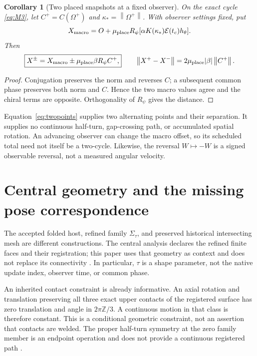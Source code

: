 \documentclass[11pt,a4paper]{article}
\numberwithin{equation}{section}
\newtheorem{corollary}[proposition]{Corollary}
\theoremstyle{definition}
\theoremstyle{remark}
\newcommand{\norm}[1]{\left\lVert#1\right\rVert}
\newcommand{\envelope}{\mathcal E}
\newcommand{\muplace}{\mu_{\rm place}}
\begin{document}
\begin{corollary}[Two placed snapshots at a fixed observer]
\label{cor:M3}
On the exact cycle \eqref{eq:M3}, let $C^+=C(\Omega^+)$ and
$\kappa_*=\norm{\Omega^+}$. With observer settings fixed, put
\begin{equation}
X_{\rm macro}=O+\muplace R_\psi
     [\alpha K(\kappa_*)\envelope(t_c)h_\theta].
\end{equation}
Then
\begin{equation}\label{eq:twopoints}
\boxed{X^\pm=X_{\rm macro}\pm\muplace\beta R_\psi C^+,}
\qquad
\norm{X^+-X^-}=2\muplace|\beta|\norm{C^+}.
\end{equation}
\end{corollary}
\begin{proof}
Conjugation preserves the norm and reverses $C$; a subsequent common phase
preserves both norm and $C$. Hence the two macro values agree and the
chiral terms are opposite. Orthogonality of $R_\psi$ gives the distance.
\end{proof}

Equation~\eqref{eq:twopoints} supplies two alternating points and their
separation. It supplies no continuous half-turn, gap-crossing path, or
accumulated spatial rotation. An advancing observer can change the macro
offset, so its scheduled total need not itself be a two-cycle. Likewise,
the reversal $W\mapsto-W$ is a signed observable reversal, not a measured
angular velocity.

\section{Central geometry and the missing pose correspondence}
\label{sec:pose}

The accepted folded host, refined family $\Sigma_\tau$, and preserved
historical intersecting mesh are different constructions. The central
analysis declares the refined finite faces and their registration; this
paper uses that geometry as context and does not replace its connectivity
\cite{Central}. In particular, $\tau$ is a shape parameter, not the native
update index, observer time, or common phase.

An inherited contact constraint is already informative. An axial rotation
and translation preserving all three exact upper contacts of the registered
surface has zero translation and angle in $2\pi\mathbb Z/3$. A continuous
motion in that class is therefore constant. This is a conditional geometric
constraint, not an assertion that contacts are welded. The proper half-turn
symmetry at the zero family member is an endpoint operation and does not
provide a continuous registered path \cite[Section 5]{Central}.
\end{document}
